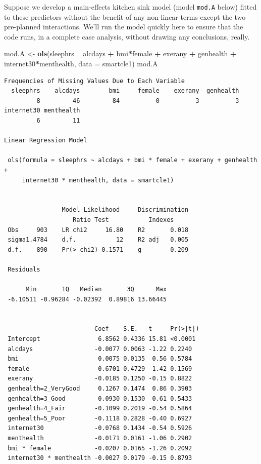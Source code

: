 \documentclass[]{book}
\newenvironment{Shaded}{\begin{snugshade}}{\end{snugshade}}
\newcommand{\KeywordTok}[1]{\textcolor[rgb]{0.13,0.29,0.53}{\textbf{#1}}}
\newcommand{\DataTypeTok}[1]{\textcolor[rgb]{0.13,0.29,0.53}{#1}}
\newcommand{\StringTok}[1]{\textcolor[rgb]{0.31,0.60,0.02}{#1}}
\newcommand{\OperatorTok}[1]{\textcolor[rgb]{0.81,0.36,0.00}{\textbf{#1}}}
\newcommand{\NormalTok}[1]{#1}
\theoremstyle{definition}
\theoremstyle{definition}
\theoremstyle{definition}
\theoremstyle{remark}
\begin{document}
Suppose we develop a main-effects kitchen sink model (model
\texttt{mod.A} below) fitted to these predictors without the benefit of
any non-linear terms except the two pre-planned interactions. We'll run
the model quickly here to ensure that the code runs, in a complete case
analysis, without drawing any conclusions, really.

\begin{Shaded}
\begin{Highlighting}[]
\NormalTok{mod.A <-}\StringTok{ }\KeywordTok{ols}\NormalTok{(sleephrs }\OperatorTok{~}\StringTok{ }\NormalTok{alcdays }\OperatorTok{+}\StringTok{ }\NormalTok{bmi}\OperatorTok{*}\NormalTok{female }\OperatorTok{+}\StringTok{ }\NormalTok{exerany }\OperatorTok{+}\StringTok{ }
\StringTok{              }\NormalTok{genhealth }\OperatorTok{+}\StringTok{ }\NormalTok{internet30}\OperatorTok{*}\NormalTok{menthealth, }
             \DataTypeTok{data =}\NormalTok{ smartcle1)}
\NormalTok{mod.A}
\end{Highlighting}
\end{Shaded}

\begin{verbatim}
Frequencies of Missing Values Due to Each Variable
  sleephrs    alcdays        bmi     female    exerany  genhealth 
         8         46         84          0          3          3 
internet30 menthealth 
         6         11 

Linear Regression Model
 
 ols(formula = sleephrs ~ alcdays + bmi * female + exerany + genhealth + 
     internet30 * menthealth, data = smartcle1)
 
 
                Model Likelihood     Discrimination    
                   Ratio Test           Indexes        
 Obs     903    LR chi2     16.80    R2       0.018    
 sigma1.4784    d.f.           12    R2 adj   0.005    
 d.f.    890    Pr(> chi2) 0.1571    g        0.209    
 
 Residuals
 
      Min       1Q   Median       3Q      Max 
 -6.10511 -0.96284 -0.02392  0.89816 13.66445 
 
 
                         Coef    S.E.   t     Pr(>|t|)
 Intercept                6.8562 0.4336 15.81 <0.0001 
 alcdays                 -0.0077 0.0063 -1.22 0.2240  
 bmi                      0.0075 0.0135  0.56 0.5784  
 female                   0.6701 0.4729  1.42 0.1569  
 exerany                 -0.0185 0.1250 -0.15 0.8822  
 genhealth=2_VeryGood     0.1267 0.1474  0.86 0.3903  
 genhealth=3_Good         0.0930 0.1530  0.61 0.5433  
 genhealth=4_Fair        -0.1099 0.2019 -0.54 0.5864  
 genhealth=5_Poor        -0.1118 0.2828 -0.40 0.6927  
 internet30              -0.0768 0.1434 -0.54 0.5926  
 menthealth              -0.0171 0.0161 -1.06 0.2902  
 bmi * female            -0.0207 0.0165 -1.26 0.2092  
 internet30 * menthealth -0.0027 0.0179 -0.15 0.8793  
 
\end{verbatim}
\end{document}
